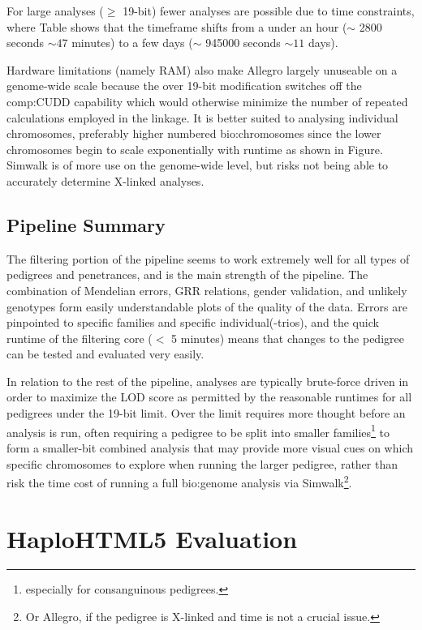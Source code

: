 For large analyses ($\geq$ 19-bit) fewer analyses are possible due to time constraints, where Table shows that the timeframe shifts from a under an hour ($\sim$ 2800 seconds $\sim 47$ minutes) to a few days ($\sim$ 945000 seconds $\sim 11$ days). 

Hardware limitations (namely RAM) also make Allegro largely unuseable on a genome-wide scale because the over 19-bit modification switches off the \gls{comp:CUDD} capability which would otherwise minimize the number of repeated calculations employed in the linkage. It is better suited to analysing individual chromosomes, preferably higher numbered \gls{bio:chromosomes} since the lower chromosomes begin to scale exponentially with runtime as shown in Figure. Simwalk is of more use on the genome-wide level, but risks not being able to accurately determine X-linked analyses.


\subsection{Pipeline Summary}

The filtering portion of the pipeline seems to work extremely well for all types of pedigrees and penetrances, and is the main strength of the pipeline. The combination of Mendelian errors, GRR relations, gender validation, and unlikely genotypes form easily understandable plots of the quality of the data. Errors are pinpointed to specific families and specific individual(-trios), and the quick runtime of the filtering core ($<$ 5 minutes) means that changes to the pedigree can be tested and evaluated very easily. 

In relation to the rest of the pipeline, analyses are typically brute-force driven in order to maximize the LOD score as permitted by the reasonable runtimes for all pedigrees under the 19-bit limit. Over the limit requires more thought before an analysis is run, often requiring a pedigree to be split into smaller families\footnote{especially for consanguinous pedigrees.} to form a smaller-bit combined analysis that may provide more visual cues on which specific chromosomes to explore when running the larger pedigree, rather than risk the time cost of running a full \gls{bio:genome} analysis via Simwalk\footnote{Or Allegro, if the pedigree is X-linked and time is not a crucial issue.}.


\section{HaploHTML5 Evaluation}

